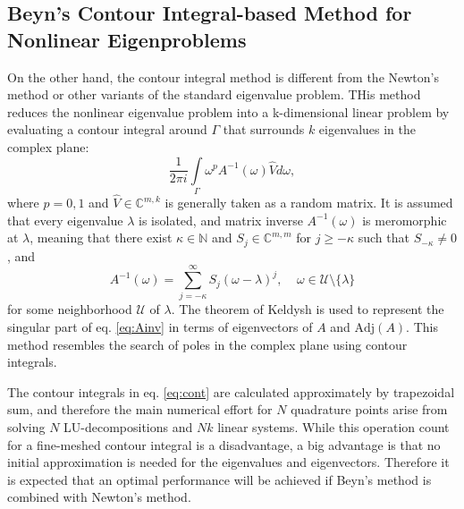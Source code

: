 \documentclass[11pt,letterpaper]{article}
\begin{document}
\begin{multicols}{2}
\subsection*{Beyn's Contour Integral-based Method for Nonlinear Eigenproblems}
On the other hand, the contour integral method is different from the Newton's method or other variants of the standard eigenvalue problem. THis method reduces the nonlinear eigenvalue problem into a k-dimensional linear problem by evaluating a contour integral around $\Gamma$ that surrounds $k$ eigenvalues in the complex plane:
\begin{equation}\label{eq:cont}
\frac{1}{2\pi i}\int\limits_{\Gamma}\omega^p A^{-1}(\omega)\hat{V}d\omega,
\end{equation}
where $p=0,1$ and $\hat{V} \in \mathbb{C}^{m,k}$ is generally taken as a random matrix. It is assumed that every eigenvalue $\lambda$ is isolated, and matrix inverse $A^{-1}(\omega)$ is meromorphic at $\lambda$, meaning that there exist $\kappa\in\mathbb{N}$ and $S_j\in \mathbb{C}^{m,m}$ for $j\geq -\kappa$ such that $S_{-\kappa}\neq 0$, and 
\begin{equation}\label{eq:Ainv}
A^{-1}(\omega)=\sum\limits_{j=-\kappa}^{\infty} S_j (\omega-\lambda)^j,\;\;
\;\; \omega \in \mathcal{U} \setminus \lbrace\lambda\rbrace 
\end{equation}
for some neighborhood $\mathcal{U}$ of $\lambda$. The theorem of Keldysh\citep{keldysh1951characteristic} is used to represent the singular part of eq. \ref{eq:Ainv} in terms of eigenvectors of $A$ and $\mathrm{Adj}(A)$. This method resembles the search of poles in the complex plane using contour integrals. 

The contour integrals in eq. \ref{eq:cont} are calculated approximately by trapezoidal sum, and therefore the main numerical effort for $N$ quadrature points arise from solving $N$ LU-decompositions and $Nk$ linear systems. While this operation count for a fine-meshed contour integral is a disadvantage, a big advantage is that no initial approximation is needed for the eigenvalues and eigenvectors. Therefore it is expected that an optimal performance will be achieved if Beyn's method is combined with Newton's method. 

\end{multicols}
\end{document}
